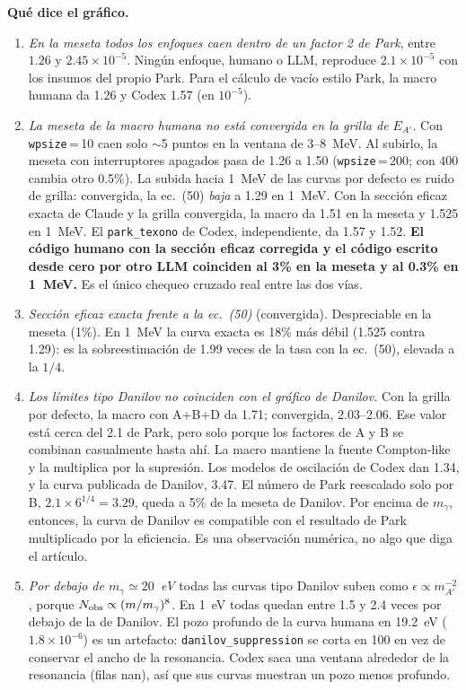 \documentclass[10pt,a4paper]{article}
\newcommand{\Ap}{A'}
\newcommand{\eps}{\epsilon}
\newcommand{\ttt}[1]{\texttt{\small #1}}
\begin{document}
\textbf{Qué dice el gráfico.}
\begin{enumerate}
\item \emph{En la meseta todos los enfoques caen dentro de un factor 2 de Park}, entre $1.26$ y $2.45\times10^{-5}$.
Ningún enfoque, humano o LLM, reproduce $2.1\times10^{-5}$ con los insumos del propio Park. Para el cálculo de vacío estilo
Park, la macro humana da 1.26 y Codex 1.57 (en $10^{-5}$).
\item \emph{La meseta de la macro humana no está convergida en la grilla de $E_{\Ap}$.} Con \ttt{wpsize}\,=\,10 caen
solo $\sim$5 puntos en la ventana de 3--8~MeV. Al subirlo, la meseta con interruptores apagados pasa de 1.26 a 1.50
(\ttt{wpsize}\,=\,200; con 400 cambia otro 0.5\%). La subida hacia 1~MeV de las curvas por defecto es ruido de grilla:
convergida, la ec.~(50) \emph{baja} a 1.29 en 1~MeV. Con la sección eficaz exacta de Claude y la grilla convergida, la macro
da 1.51 en la meseta y 1.525 en 1~MeV. El \ttt{park\_texono} de Codex, independiente, da 1.57 y 1.52. \textbf{El código
humano con la sección eficaz corregida y el código escrito desde cero por otro LLM coinciden al 3\% en la meseta y al
0.3\% en 1~MeV.} Es el único chequeo cruzado real entre las dos vías.
\item \emph{Sección eficaz exacta frente a la ec.~(50)} (convergida). Despreciable en la meseta (1\%). En 1~MeV la curva
exacta es 18\% más débil (1.525 contra 1.29): es la sobreestimación de 1.99 veces de la tasa con la ec.~(50), elevada a la
$1/4$.
\item \emph{Los límites tipo Danilov no coinciden con el gráfico de Danilov.} Con la grilla por defecto, la macro con
A+B+D da 1.71; convergida, 2.03--2.06. Ese valor está cerca del 2.1 de Park, pero solo porque los factores de A y B se
combinan casualmente hasta ahí. La macro mantiene la fuente Compton-like y la multiplica por la supresión. Los modelos de
oscilación de Codex dan 1.34, y la curva publicada de Danilov, 3.47. El número de Park reescalado solo por B,
$2.1\times6^{1/4}=3.29$, queda a 5\% de la meseta de Danilov. Por encima de $m_\gamma$, entonces, la curva de Danilov es
compatible con el resultado de Park multiplicado por la eficiencia. Es una observación numérica, no algo que diga el
artículo.
\item \emph{Por debajo de $m_\gamma\simeq20$~eV} todas las curvas tipo Danilov suben como $\eps\propto m_{\Ap}^{-2}$, porque
$N_{\rm obs}\propto(m/m_\gamma)^8$. En 1~eV todas quedan entre 1.5 y 2.4 veces por debajo de la de Danilov. El pozo profundo de
la curva humana en 19.2~eV ($1.8\times10^{-6}$) es un artefacto: \ttt{danilov\_suppression} se corta en 100 en vez de
conservar el ancho de la resonancia. Codex saca una ventana alrededor de la resonancia (filas nan), así que sus curvas
muestran un pozo menos profundo.
\end{enumerate}
\end{document}
